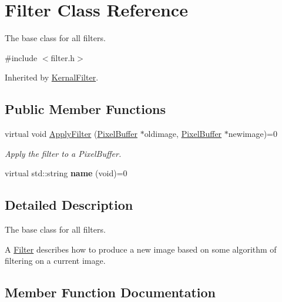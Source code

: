 \hypertarget{classFilter}{}\section{Filter Class Reference}
\label{classFilter}


The base class for all filters.  




{\ttfamily \#include $<$filter.\+h$>$}



Inherited by \hyperlink{classKernalFilter}{Kernal\+Filter}.

\subsection*{Public Member Functions}
\begin{DoxyCompactItemize}
\item 
virtual void \hyperlink{classFilter_ab005e437143fe1b8d075eb7891441e89}{Apply\+Filter} (\hyperlink{classimage__tools_1_1PixelBuffer}{Pixel\+Buffer} $\ast$oldimage, \hyperlink{classimage__tools_1_1PixelBuffer}{Pixel\+Buffer} $\ast$newimage)=0
\begin{DoxyCompactList}\small\item\em Apply the filter to a Pixel\+Buffer. \end{DoxyCompactList}\item 
virtual std\+::string {\bfseries name} (void)=0\hypertarget{classFilter_afad856c097408e1342ed55a91c325572}{}\label{classFilter_afad856c097408e1342ed55a91c325572}

\end{DoxyCompactItemize}


\subsection{Detailed Description}
The base class for all filters. 

A \hyperlink{classFilter}{Filter} describes how to produce a new image based on some algorithm of filtering on a current image. 

\subsection{Member Function Documentation}
